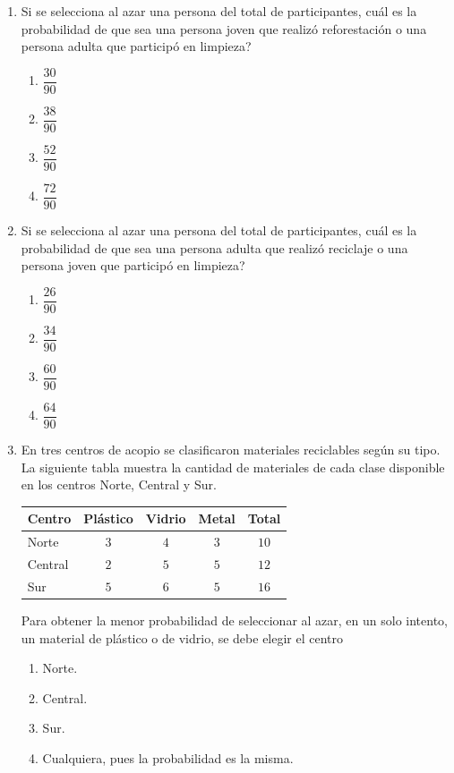 \documentclass[12pt]{article}
\newcommand{\opcion}[2]{\item $#2$}
\begin{document}
\begin{enumerate}[label=\textbf{\arabic*.}, start=29, itemsep=1cm]
\item
Si se selecciona al azar una persona del total de participantes, \textquestiondown cu\'al es la probabilidad de que sea una persona joven que realiz\'o reforestaci\'on o una persona adulta que particip\'o en limpieza?

\begin{enumerate}[label=\Alph*)]
  \opcion{A}{\dfrac{30}{90}}
  \opcion{B}{\dfrac{38}{90}}
  \opcion{C}{\dfrac{52}{90}}
  \opcion{D}{\dfrac{72}{90}}
\end{enumerate}

\item
Si se selecciona al azar una persona del total de participantes, \textquestiondown cu\'al es la probabilidad de que sea una persona adulta que realiz\'o reciclaje o una persona joven que particip\'o en limpieza?

\begin{enumerate}[label=\Alph*)]
  \opcion{A}{\dfrac{26}{90}}
  \opcion{B}{\dfrac{34}{90}}
  \opcion{C}{\dfrac{60}{90}}
  \opcion{D}{\dfrac{64}{90}}
\end{enumerate}

\Needspace{0.62\textheight}
\item
En tres centros de acopio se clasificaron materiales reciclables seg\'un su tipo. La siguiente tabla muestra la cantidad de materiales de cada clase disponible en los centros Norte, Central y Sur.

\begin{center}
\renewcommand{\arraystretch}{1.35}
\begin{tabular}{|l|c|c|c|c|}
\hline
\textbf{Centro} & \textbf{Pl\'astico} & \textbf{Vidrio} & \textbf{Metal} & \textbf{Total} \\ \hline
Norte   & $3$ & $4$ & $3$ & $10$ \\ \hline
Central & $2$ & $5$ & $5$ & $12$ \\ \hline
Sur     & $5$ & $6$ & $5$ & $16$ \\ \hline
\end{tabular}
\end{center}

Para obtener la menor probabilidad de seleccionar al azar, en un solo intento, un material de pl\'astico o de vidrio, se debe elegir el centro

\begin{enumerate}[label=\Alph*)]
  \item Norte.
  \item Central.
  \item Sur.
  \item Cualquiera, pues la probabilidad es la misma.
\end{enumerate}


\end{enumerate}
\end{document}
